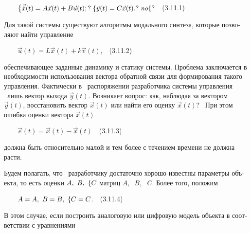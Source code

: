 \documentclass[a4paper]{article}
\newcommand\normalsubformula[1]{\text{\mathversion{normal}$#1$}}
\begin{document}
{\begin{russian}\sffamily
\ \ \ \  $\begin{matrix}\left\{\vec{\dot x}(t)=A\vec x(t)+B\vec u(t);?\right.\left\{\vec y(t)=C\vec
x(t).?\right.\mathit{no}\hfill\null \end{matrix}\{?$\ \ (3.11.1)
\end{russian}}

{\begin{russian}\sffamily
Для такой системы существуют алгоритмы модального синтеза, которые позволяют найти управление
\end{russian}}

{\begin{russian}\sffamily
\ \ \ \  $\vec u(t)=L\vec x(t)+k\vec v(t)$,\ \ (3.11.2)
\end{russian}}

{\begin{russian}\sffamily
обеспе­чивающее заданные динамику и статику системы. Проблема заключается в необходимости использования вектора обратной
связи для формирова­ния такого управления. Фактически в \ распоряжении разработчика системы управления \ лишь вектор
выхода  $\vec y(t)$. Возникает вопрос: как, наблюдая за вектором  $\vec y(t)$, восстановить вектор  $\vec x(t)$ или
найти его оценку  $\vec x(t)$? \ При этом ошибка оценки вектора  $\vec x(t)$
\end{russian}}

{\begin{russian}\sffamily
\ \ \ \  $\vec e(t)=\vec x(t)-\vec x(t)$\ \ (3.11.3)
\end{russian}}

{\begin{russian}\sffamily
должна быть относительно малой и тем более с течением времени не должна расти.
\end{russian}}

{\begin{russian}\sffamily
Будем полагать, что \ разработчику достаточно хорошо известны параметры объекта, то есть оценки  $A,\text{  }B,\text{  
\{}\normalsubformula C$ матриц  $A,\;\;B,\text{  }C$. Более того, положим
\end{russian}}

{\begin{russian}\sffamily
\ \ \ \  $A=A,\text{  }B=B,\text{   \{}\normalsubformula C=C$.\ \ (3.11.4)
\end{russian}}

{\begin{russian}\sffamily
В этом случае, если построить аналоговую или цифровую модель объекта в соответствии с уравнениями
\end{russian}}
\end{document}
